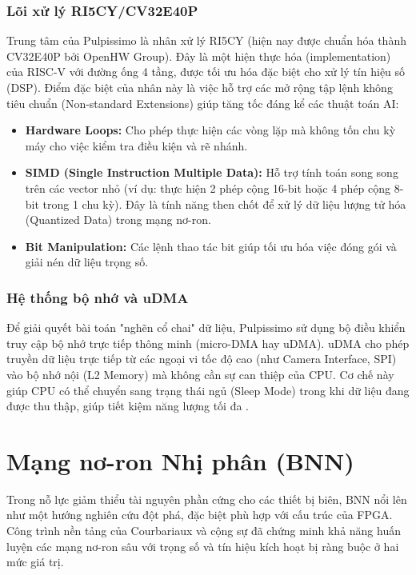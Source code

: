 \subsubsection{Lõi xử lý RI5CY/CV32E40P}
Trung tâm của Pulpissimo là nhân xử lý RI5CY (hiện nay được chuẩn hóa thành CV32E40P bởi OpenHW Group). 
Đây là một hiện thực hóa (implementation) của RISC-V với đường ống 4 tầng, được tối ưu hóa đặc biệt cho 
xử lý tín hiệu số (DSP).
Điểm đặc biệt của nhân này là việc hỗ trợ các mở rộng tập lệnh không tiêu chuẩn (Non-standard Extensions) 
giúp tăng tốc đáng kể các thuật toán AI:
\begin{itemize}
    \item \textbf{Hardware Loops:} Cho phép thực hiện các vòng lặp mà không tốn chu kỳ máy cho 
    việc kiểm tra điều kiện và rẽ nhánh.
    \item \textbf{SIMD (Single Instruction Multiple Data):} Hỗ trợ tính toán song song trên các 
    vector nhỏ (ví dụ: thực hiện 2 phép cộng 16-bit hoặc 4 phép cộng 8-bit trong 1 chu kỳ). 
    Đây là tính năng then chốt để xử lý dữ liệu lượng tử hóa (Quantized Data) trong mạng nơ-ron.
    \item \textbf{Bit Manipulation:} Các lệnh thao tác bit giúp tối ưu hóa việc đóng gói và giải nén 
    dữ liệu trọng số.
\end{itemize}

\subsubsection{Hệ thống bộ nhớ và uDMA}
Để giải quyết bài toán "nghẽn cổ chai" dữ liệu, Pulpissimo sử dụng bộ điều khiển truy cập bộ nhớ 
trực tiếp thông minh (micro-DMA hay uDMA). uDMA cho phép truyền dữ liệu trực tiếp từ các ngoại 
vi tốc độ cao (như Camera Interface, SPI) vào bộ nhớ nội (L2 Memory) mà không cần sự can thiệp 
của CPU. Cơ chế này giúp CPU có thể chuyển sang trạng thái ngủ (Sleep Mode) trong khi dữ liệu đang 
được thu thập, giúp tiết kiệm năng lượng tối đa .

\newpage
\section{Mạng nơ-ron Nhị phân (BNN)}

Trong nỗ lực giảm thiểu tài nguyên phần cứng cho các thiết bị biên, BNN nổi lên như một hướng 
nghiên cứu đột phá, đặc biệt phù hợp với cấu trúc của FPGA. Công trình nền tảng của Courbariaux 
và cộng sự \cite{bnn_courbariaux} đã chứng minh khả năng huấn luyện các mạng nơ-ron 
sâu với trọng số và tín hiệu kích hoạt bị ràng buộc ở hai mức giá trị.

